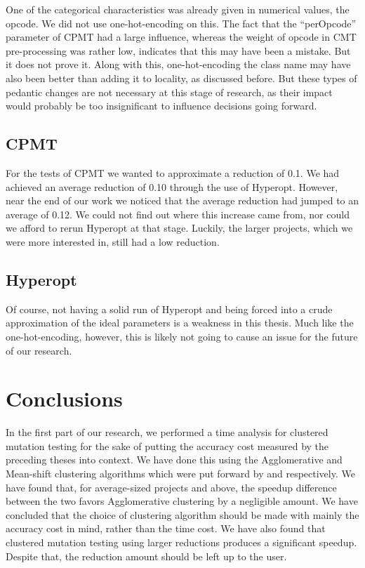 \documentclass[twoside]{uva-inf-bachelor-thesis}
\begin{document}
One of the categorical characteristics was already given in numerical values, the opcode. We did not use one-hot-encoding on this. The fact that the ``perOpcode'' parameter of CPMT had a large influence, whereas the weight of opcode in CMT pre-processing was rather low, indicates that this may have been a mistake. But it does not prove it. Along with this, one-hot-encoding the class name may have also been better than adding it to locality, as discussed before. But these types of pedantic changes are not necessary at this stage of research, as their impact would probably be too insignificant to influence decisions going forward.

\subsection{CPMT}
For the tests of CPMT we wanted to approximate a reduction of 0.1. We had achieved an average reduction of 0.10 through the use of Hyperopt. However, near the end of our work we noticed that the average reduction had jumped to an average of 0.12. We could not find out where this increase came from, nor could we afford to rerun Hyperopt at that stage. Luckily, the larger projects, which we were more interested in, still had a low reduction.

\subsection{Hyperopt}
Of course, not having a solid run of Hyperopt and being forced into a crude approximation of the ideal parameters is a weakness in this thesis. Much like the one-hot-encoding, however, this is likely not going to cause an issue for the future of our research.

\section{Conclusions}
In the first part of our research, we performed a time analysis for clustered mutation testing for the sake of putting the accuracy cost measured by the preceding theses into context. We have done this using the Agglomerative and Mean-shift clustering algorithms which were put forward by \textcite{Basarat21} and \textcite{Mouissie22} respectively. We have found that, for average-sized projects and above, the speedup difference between the two favors Agglomerative clustering by a negligible amount. We have concluded that the choice of clustering algorithm should be made with mainly the accuracy cost in mind, rather than the time cost. We have also found that clustered mutation testing using larger reductions produces a significant speedup. Despite that, the reduction amount should be left up to the user.
\end{document}
